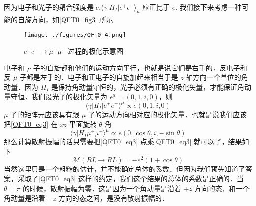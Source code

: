 因为电子和光子的耦合强度是 $e$,$\langle \gamma | H_I | e^+ e^- \rangle_\mu$ 应正比于 $e$. 我们接下来考虑一种可能的自旋方向，如\autoref{QFT0_fig3} 所示
\begin{figure}[ht]
\centering
\texttt{[image: ./figures/QFT0\_4.png]}
\caption{$e^+e^-\rightarrow\mu^+\mu^-$ 过程的极化示意图} \label{QFT0_fig3}
\end{figure}
电子和 $\mu$ 子的自旋都和他们的运动方向平行，也就是说它们是右手的．反电子和反 $\mu$ 子都是左手的．电子和正电子的自旋加起来相当于是 $z$ 轴方向一个单位的角动量．因为 $H_I$ 是保持角动量守恒的，光子必须有正确的极化矢量，才能保证角动量守恒．我们设光子的极化矢量为 $\epsilon^\mu =(0,1,i,0)$，则
\begin{equation}
\langle \gamma | H_I | e^+ e^- \rangle^\mu \propto e (0,1,i ,0)
\end{equation}
$\mu$ 子的矩阵元应该具有跟 $\mu$ 子的运动方向相对应的极化矢量．也就是说我们应该把\autoref{QFT0_eq3} 在 $xz$ 平面旋转 $\theta$ 角
\begin{equation}
\langle \gamma| H_I \mu^+\mu^-\rangle^\mu \propto e (0,\cos\theta, i, - \sin\theta) 
\end{equation}
那么计算散射振幅的话只需要把\autoref{QFT0_eq3} 点乘\autoref{QFT0_eq3} 就可以了，结果如下
\begin{equation}
\mathcal M(RL\rightarrow RL) = - e^2 (1+\cos\theta)
\end{equation}
当然这里只是一个粗糙的估计，并不能确定总体的系数．但因为我们预先知道了答案，采取了\autoref{QFT0_eq3} 这样的约定，我们这个结果的总体的系数是正确的．当 $\theta = \pi$ 的时候，散射振幅为零．这是因为一个角动量是沿着 $+z$ 方向的态，和一个角动量是沿着 $-z$ 方向的态之间，是没有散射振幅的．

